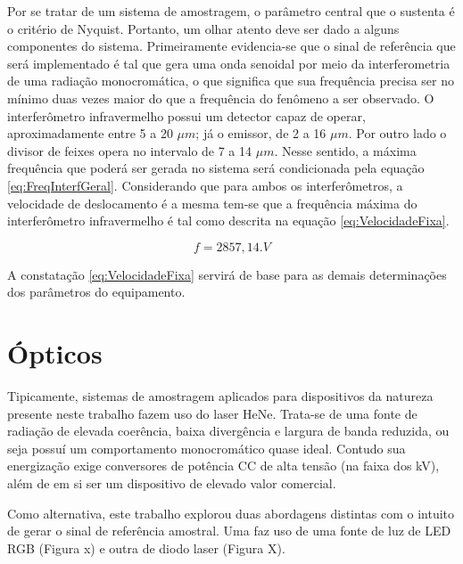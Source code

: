 \documentclass[oneside,openright,12pt]{ufsm_2021} %
\begin{document}
    \par Por se tratar de um sistema de amostragem, o parâmetro central que o sustenta é o critério de Nyquist. Portanto, um olhar atento deve ser dado a alguns componentes do sistema. Primeiramente evidencia-se que o sinal de referência que será implementado é tal que gera uma onda senoidal por meio da interferometria de uma radiação monocromática, o que significa que sua frequência precisa ser no mínimo duas vezes maior do que a frequência do fenômeno a ser observado. O interferômetro infravermelho possui um detector capaz de operar, aproximadamente entre 5 a 20 $\mu m$; já o emissor, de 2 a 16 $\mu m$. Por outro lado o divisor de feixes opera no intervalo de 7 a 14 $\mu m$. Nesse sentido, a máxima frequência que poderá ser gerada no sistema será condicionada pela equação \ref{eq:FreqInterfGeral}. Considerando que para ambos os interferômetros, a velocidade de deslocamento é a mesma tem-se que a frequência máxima do interferômetro infravermelho é tal como descrita na equação \ref{eq:VelocidadeFixa}.

        \begin{equation}
            \label{eq:VelocidadeFixa}
            f = 2857,14.V
        \end{equation}

    \par A constatação \ref{eq:VelocidadeFixa} servirá de base para as demais determinações dos parâmetros do equipamento. 
    
    \section{Ópticos}
    \label{sec:Opticos}
        \par Tipicamente, sistemas de amostragem aplicados para dispositivos da natureza presente neste trabalho fazem uso do laser HeNe. Trata-se de uma fonte de radiação de elevada coerência, baixa divergência e largura de banda reduzida, ou seja possuí um comportamento monocromático quase ideal. Contudo sua energização exige conversores de potência CC de alta tensão (na faixa dos kV), além de em si ser um dispositivo de elevado valor comercial. 

        \par Como alternativa, este trabalho explorou duas abordagens distintas com o intuito de gerar o sinal de referência amostral. Uma faz uso de uma fonte de luz de LED RGB (Figura x) e outra de diodo laser (Figura X).
\end{document}
